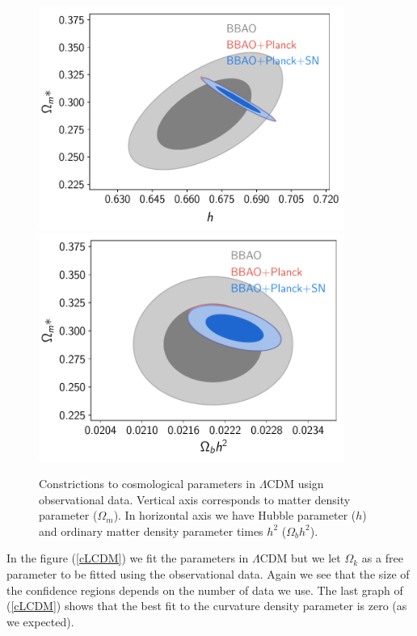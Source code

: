 \documentclass[onecolumn,           %
               showpacs,            %
               preprintnumbers,     %
               aps,                 %
               prl,          	    %
               letterpaper,             %
               superscriptaddress,      %
               nofootinbib,         %
               tightenlines,        %
               floats,floatfix      %
               ,usenatbib,
               ]{revtex4-1}
\begin{document}
\begin{figure}[htp]
	\centering
	\includegraphics[width=10cm]{FiguresCosmo/h_Om_LCDM_todas.pdf}	
	\includegraphics[width=10cm]{FiguresCosmo/Obh2_Om_LCDM_todas.pdf}
	\caption{Constrictions to cosmological parameters in $\Lambda$CDM usign observational data. Vertical axis corresponds to matter density parameter ($\Omega_m$). In horizontal axis we have Hubble parameter ($h$) and ordinary matter density parameter times $h^2$ ($\Omega_b h^2$).}
	\label{LCDM}
\end{figure}

In the figure (\ref{cLCDM}) we fit the parameters in $\Lambda$CDM but we let $\Omega_k$ as a free parameter to be fitted using the observational data. Again we see that the size of the confidence regions depends on the number of data we use. The last graph of (\ref{cLCDM}) shows that the best fit to the curvature density parameter is zero (as we expected).
\end{document}
